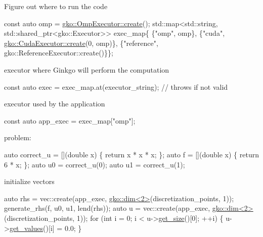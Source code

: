 Figure out where to run the code


\begin{DoxyCode}
\textcolor{keyword}{const} \textcolor{keyword}{auto} omp = \hyperlink{classgko_1_1OmpExecutor_a33ca05fdd0fc928ee262fc9425304874}{gko::OmpExecutor::create}();
std::map<std::string, std::shared\_ptr<gko::Executor>> exec\_map\{
    \{\textcolor{stringliteral}{"omp"}, omp\},
    \{\textcolor{stringliteral}{"cuda"}, \hyperlink{classgko_1_1CudaExecutor_a2718a92034350650ef406ffdb60db090}{gko::CudaExecutor::create}(0, omp)\},
    \{\textcolor{stringliteral}{"reference"}, gko::ReferenceExecutor::create()\}\};
\end{DoxyCode}


executor where Ginkgo will perform the computation


\begin{DoxyCode}
\textcolor{keyword}{const} \textcolor{keyword}{auto} exec = exec\_map.at(executor\_string);  \textcolor{comment}{// throws if not valid}
\end{DoxyCode}


executor used by the application


\begin{DoxyCode}
\textcolor{keyword}{const} \textcolor{keyword}{auto} app\_exec = exec\_map[\textcolor{stringliteral}{"omp"}];
\end{DoxyCode}


problem\+:


\begin{DoxyCode}
\textcolor{keyword}{auto} correct\_u = [](\textcolor{keywordtype}{double} x) \{ \textcolor{keywordflow}{return} x * x * x; \};
\textcolor{keyword}{auto} f = [](\textcolor{keywordtype}{double} x) \{ \textcolor{keywordflow}{return} 6 * x; \};
\textcolor{keyword}{auto} u0 = correct\_u(0);
\textcolor{keyword}{auto} u1 = correct\_u(1);
\end{DoxyCode}


initialize vectors


\begin{DoxyCode}
\textcolor{keyword}{auto} rhs = vec::create(app\_exec, \hyperlink{structgko_1_1dim}{gko::dim<2>}(discretization\_points, 1));
generate\_rhs(f, u0, u1, lend(rhs));
\textcolor{keyword}{auto} u = vec::create(app\_exec, \hyperlink{structgko_1_1dim}{gko::dim<2>}(discretization\_points, 1));
\textcolor{keywordflow}{for} (\textcolor{keywordtype}{int} i = 0; i < u->\hyperlink{classgko_1_1LinOp_a31b3c003388eb0b95393154f68c2b98d}{get\_size}()[0]; ++i) \{
    u->\hyperlink{classgko_1_1matrix_1_1Dense_a3bc458e02fab8e4c9f60f70bd4d5a4f9}{get\_values}()[i] = 0.0;
\}
\end{DoxyCode}


